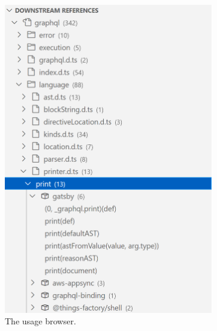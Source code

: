 \begin{figure}[b]
\begin{subfigure}{.32\linewidth}
		\includegraphics[width=\linewidth]{sections/6_implementation/extension/references.png}
		\caption[LoF entry]{The usage browser.}
		\label{fig:implementation/presentation/screenshot/usage_browser}
	\end{subfigure}
	\hfill
	\begin{subfigure}{.32\linewidth}

\end{subfigure}
\end{figure}

